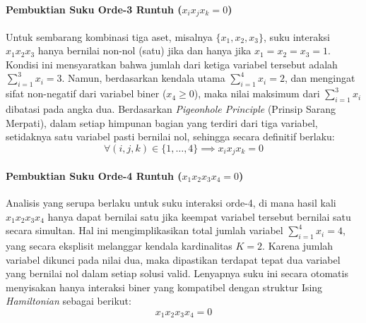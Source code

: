 \paragraph{Pembuktian Suku Orde-3 Runtuh ($x_i x_j x_k = 0$)}
Untuk sembarang kombinasi tiga aset, misalnya $\{x_1, x_2, x_3\}$, suku interaksi $x_1 x_2 x_3$ hanya bernilai non-nol (satu) jika dan hanya jika $x_1 = x_2 = x_3 = 1$. Kondisi ini mensyaratkan bahwa jumlah dari ketiga variabel tersebut adalah $\sum_{i=1}^3 x_i = 3$. Namun, berdasarkan kendala utama $\sum_{i=1}^4 x_i = 2$, dan mengingat sifat non-negatif dari variabel biner ($x_4 \ge 0$), maka nilai maksimum dari $\sum_{i=1}^3 x_i$ dibatasi pada angka dua. Berdasarkan \textit{Pigeonhole Principle} (Prinsip Sarang Merpati), dalam setiap himpunan bagian yang terdiri dari tiga variabel, setidaknya satu variabel pasti bernilai nol, sehingga secara definitif berlaku:
\begin{equation}
    \forall (i,j,k) \in \{1, \dots, 4\} \implies x_i x_j x_k = 0
\end{equation}

\paragraph{Pembuktian Suku Orde-4 Runtuh ($x_1 x_2 x_3 x_4 = 0$)}
Analisis yang serupa berlaku untuk suku interaksi orde-4, di mana hasil kali $x_1 x_2 x_3 x_4$ hanya dapat bernilai satu jika keempat variabel tersebut bernilai satu secara simultan. Hal ini mengimplikasikan total jumlah variabel $\sum_{i=1}^4 x_i = 4$, yang secara eksplisit melanggar kendala kardinalitas $K=2$. Karena jumlah variabel dikunci pada nilai dua, maka dipastikan terdapat tepat dua variabel yang bernilai nol dalam setiap solusi valid. Lenyapnya suku ini secara otomatis menyisakan hanya interaksi biner yang kompatibel dengan struktur Ising \textit{Hamiltonian} sebagai berikut:
\begin{equation}
    x_1 x_2 x_3 x_4 = 0
\end{equation}

